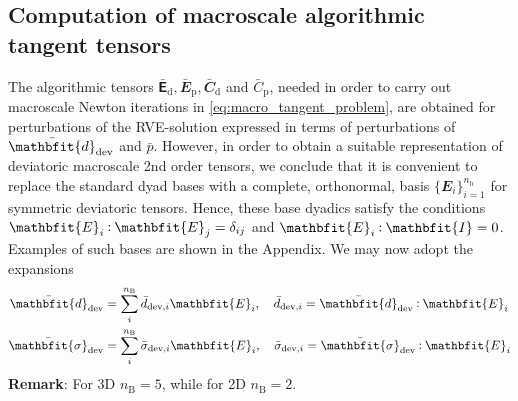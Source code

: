 \documentclass[12pt,review]{elsarticle}
\renewcommand{\ta}[1]{\mathbfit{#1}}
\renewcommand{\ts}[1]{\mathbfit{#1}}
\renewcommand{\tf}[1]{\mathbfsfup{#1}}
\renewcommand{\Box}{\mdlgwhtsquare}
\newcommand{\ded}{\mathrm{d}}
\newcommand{\dep}{\mathrm{p}}
\begin{document}
% 



\subsection{Computation of macroscale algorithmic tangent tensors}

The algorithmic tensors $\bar{\tf{E}}_\ded, \bar{\ts E }_\dep, \bar{\ts C}_\ded$ and $\bar{C}_\dep$, needed in order to carry out macroscale Newton iterations in \eqref{eq:macro_tangent_problem}, are obtained for perturbations of the RVE-solution expressed in terms of perturbations of $\bar{\ts d}_\dev$ and $\bar{p}$. However, in order to obtain a suitable representation of deviatoric macroscale 2nd order tensors, we conclude that it is convenient to replace the standard dyad bases with a complete, orthonormal, basis $\{\ts E_i\}_{i=1}^{n_{\mathrm{b}}}$ for symmetric deviatoric tensors.
Hence, these base dyadics satisfy the conditions $\ts E_i \dprod \ts E_j = \delta_{ij}$ and $\ts E_i\dprod{\ts I}=0$.
Examples of such bases are shown in the Appendix. We may now adopt the expansions
\begin{align}
 \bar{\ts d}_\dev &= \sum_i^{n_{\mathrm{B}}} \bar{d}_{\dev,i} \ts E_i,\quad  \bar{d}_{\dev,i} = \bar{\ts d}_\dev\dprod \ts E_i
\label{eq:d_dev_base} \\
 \bar{\ts\sigma}_\dev &= \sum_i^{n_{\mathrm{B}}} \bar{\sigma}_{\dev,i} \ts E_i,\quad \bar{\sigma}_{\dev,i} = \bar{\ts\sigma}_\dev\dprod \ts E_i
\label{eq:s_dev_base}
\end{align}
\textbf{Remark}: For 3D $n_{\mathrm{B}} = 5$, while for 2D $n_{\mathrm{B}} = 2$.
\end{document}
